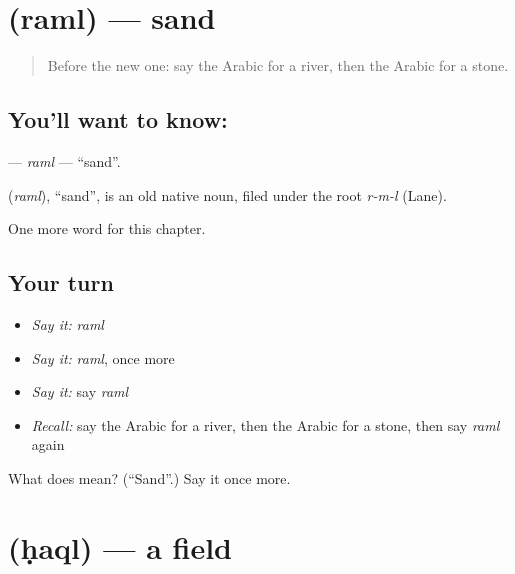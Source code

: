 \section[\texorpdfstring{\ar{رمل} (raml)}{رمل (raml)}]{ (raml) — sand}

\label{lesson:AR-C76-raml}



\begin{quote}
Before the new one: say the Arabic for a river, then the Arabic for a stone.
\end{quote}

\subsection*{You'll want to know: }
\textbf{} — \emph{raml} — \textquotedblleft{}sand\textquotedblright{}.

\begin{cousinweb}
\textbf{} (\emph{raml}), \textquotedblleft{}sand\textquotedblright{}, is an old native noun, filed under the root \emph{r-m-l} (Lane).
\end{cousinweb}

\begin{grammarlens}[title={What you've built}]
One more word for this chapter.
\end{grammarlens}

\subsection*{Your turn}
\begin{itemize}
\raggedright
  \item \emph{Say it:} \emph{raml}
  \item \emph{Say it:} \emph{raml}, once more
  \item \emph{Say it:} say \emph{raml}
  \item \emph{Recall:} say the Arabic for a river, then the Arabic for a stone, then say \emph{raml} again
\end{itemize}

\begin{tcolorbox}[breakable,colback=teal!4,colframe=teal!35!black,title={Before you move on}]
What does  mean? (\textquotedblleft{}Sand\textquotedblright{}.) Say it once more.
\end{tcolorbox}
\section[\texorpdfstring{\ar{حقل} (ḥaql)}{حقل (ḥaql)}]{ (ḥaql) — a field}

